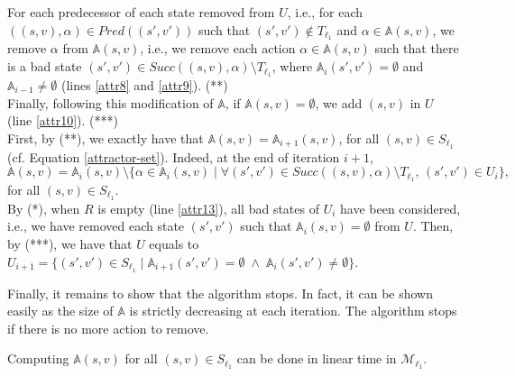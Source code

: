\begin{proof2}
For each predecessor of each state removed from $U$, i.e., for each $((s, v), \alpha) \in Pred((s', v'))$ such that $(s', v') \not \in T_{\ell_1}$ and $\alpha \in \mathbb{A}(s, v)$, we remove $\alpha$ from $\mathbb{A}(s, v)$, i.e., we remove each action $\alpha \in \mathbb{A}(s, v)$ such that there is a bad state $(s', v') \in Succ((s, v), \alpha) \setminus T_{\ell_1}$, where $\mathbb{A}_i(s', v') = \emptyset$ and $\mathbb{A}_{i-1} \neq \emptyset$
(lines \ref{attr8} and \ref{attr9}).
 {\color{umons-red}(**)}\\
Finally, following this modification of $\mathbb{A}$, if $\mathbb{A}(s, v) = \emptyset$, we add $(s, v)$ in $U$ (line \ref{attr10}). {\color{umons-red}(***)}\\
First, by {\color{umons-red}(**)}, we exactly have that $\mathbb{A}(s, v) = \mathbb{A}_{i+1}(s, v)$, for all $(s, v) \in S_{\ell_1}$ (cf. Equation \ref{attractor-set}).
Indeed, at the end of iteration $i+1$, \[\mathbb{A}(s, v) = \mathbb{A}_{i}(s, v) \setminus
\{ \alpha \in \mathbb{A}_{i}(s, v) \; | \; \forall (s', v') \in Succ((s, v), \alpha) \setminus T_{\ell_1}, \, (s', v') \in U_i\},\]
for all $(s, v) \in S_{\ell_1}$.\\
By {\color{umons-red}(*)}, when $R$ is empty (line \ref{attr13}), all bad states of $U_i$ have been considered, i.e., we have removed each state $(s', v')$ such that $\mathbb{A}_{i}(s, v) = \emptyset$ from $U$.
Then, by {\color{umons-red}(***)}, we have that $U$ equals to $U_{i+1} = \{(s', v') \in S_{\ell_1} \; | \; \mathbb{A}_{i+1}(s', v') = \emptyset \; \wedge \; \mathbb{A}_{i}(s', v') \neq \emptyset  \}$.
\par Finally, it remains to show that the algorithm stops. In fact,
it can be shown easily as the size of $\mathbb{A}$ is strictly decreasing at each iteration.
The algorithm stops if there is no more action to remove.
\end{proof2}

\begin{lemma}\label{attr-algo-lemma-2}
 Computing $\mathbb{A}(s, v)$ for all $(s, v) \in S_{\ell_1}$ can be done in linear time in $\mathcal{M}_{\ell_1}$.
\end{lemma}

